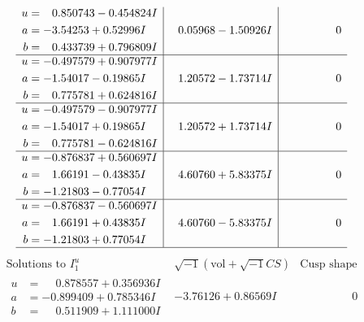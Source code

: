 \documentclass[1p]{elsarticle_modified}
\theoremstyle{definition}
\newcommand{\I}{\sqrt{-1}}
\begin{document}
$$\begin{array}{c|c|c}
\begin{aligned}
u &= \phantom{-}0.850743 - 0.454824 I \\
a &= -3.54253 + 0.52996 I \\
b &= \phantom{-}0.433739 + 0.796809 I\end{aligned}
 & \phantom{-}0.05968 - 1.50926 I & \phantom{-0.000000 } 0 \\ \hline\begin{aligned}
u &= -0.497579 + 0.907977 I \\
a &= -1.54017 - 0.19865 I \\
b &= \phantom{-}0.775781 + 0.624816 I\end{aligned}
 & \phantom{-}1.20572 - 1.73714 I & \phantom{-0.000000 } 0 \\ \hline\begin{aligned}
u &= -0.497579 - 0.907977 I \\
a &= -1.54017 + 0.19865 I \\
b &= \phantom{-}0.775781 - 0.624816 I\end{aligned}
 & \phantom{-}1.20572 + 1.73714 I & \phantom{-0.000000 } 0 \\ \hline\begin{aligned}
u &= -0.876837 + 0.560697 I \\
a &= \phantom{-}1.66191 - 0.43835 I \\
b &= -1.21803 - 0.77054 I\end{aligned}
 & \phantom{-}4.60760 + 5.83375 I & \phantom{-0.000000 } 0 \\ \hline\begin{aligned}
u &= -0.876837 - 0.560697 I \\
a &= \phantom{-}1.66191 + 0.43835 I \\
b &= -1.21803 + 0.77054 I\end{aligned}
 & \phantom{-}4.60760 - 5.83375 I & \phantom{-0.000000 } 0\\
 \hline 
 \end{array}$$\newpage$$\begin{array}{c|c|c}  
\text{Solutions to }I^u_{1}& \I (\text{vol} + \sqrt{-1}CS) & \text{Cusp shape}\\
 \hline 
\begin{aligned}
u &= \phantom{-}0.878557 + 0.356936 I \\
a &= -0.899409 + 0.785346 I \\
b &= \phantom{-}0.511909 + 1.111000 I\end{aligned}
 & -3.76126 + 0.86569 I & \phantom{-0.000000 } 0 \\ \hline\begin{aligned}

\end{aligned}
\end{array}$$
\end{document}
